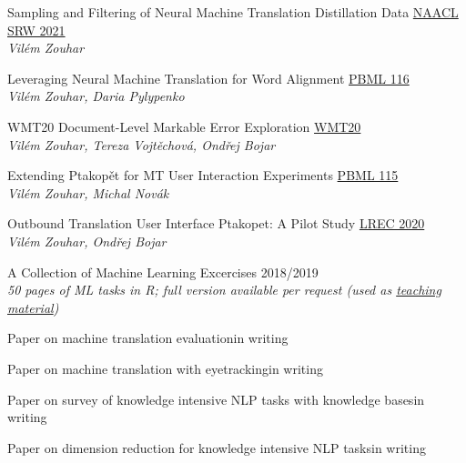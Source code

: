 \documentclass[11pt,a4paper]{article} %
\newcommand{\hSubsectionA}[2]{{#1}\hfill {#2}\hspace{-1cm}}
\newcommand{\hSubsectionB}[3]{
    {#1} \hfill {\footnotesize #2}\hspace{-1cm}\\
    \vspace{-0.2cm} \hspace{-0.17cm}\textit{\footnotesize #3}
    \vspace{0.1cm}
}
\begin{document}
\hSubsectionB
{Sampling and Filtering of Neural Machine Translation Distillation Data}
{\href{https://arxiv.org/pdf/2104.00664.pdf}{NAACL SRW 2021}}
{Vilém Zouhar}

\hSubsectionB
{Leveraging Neural Machine Translation for Word Alignment}
{\href{https://ufal.mff.cuni.cz/pbml/116/art-zouhar-pylypenko.pdf}{PBML 116}}
{Vilém Zouhar, Daria Pylypenko}

\hSubsectionB
{WMT20 Document-Level Markable Error Exploration}
{\href{http://www.statmt.org/wmt20/pdf/2020.wmt-1.41.pdf}{WMT20}}
{Vilém Zouhar, Tereza Vojtěchová, Ondřej Bojar}

\hSubsectionB
{Extending Ptakopět for MT User Interaction Experiments}
{\href{https://ufal.mff.cuni.cz/pbml/115/art-zouhar-novak.pdf}{PBML 115}}
{Vilém Zouhar, Michal Novák}

\hSubsectionB
{Outbound Translation User Interface Ptakopet: A Pilot Study}
{\href{https://www.aclweb.org/anthology/2020.lrec-1.860.pdf}{LREC 2020}}
{Vilém Zouhar, Ondřej Bojar}

\hSubsectionB
{A Collection of Machine Learning Excercises}
{2018/2019}
{50 pages of ML tasks in R; full version available per request (used as \href{http://ufal.mff.cuni.cz/courses/npfl054}{teaching material})}

\hSubsectionA
{Paper on machine translation evaluation}
{in writing}

\hSubsectionA
{Paper on machine translation with eyetracking}
{in writing}

\hSubsectionA
{Paper on survey of knowledge intensive NLP tasks with knowledge bases}
{in writing}

\hSubsectionA
{Paper on dimension reduction for knowledge intensive NLP tasks}
{in writing}
\end{document}
